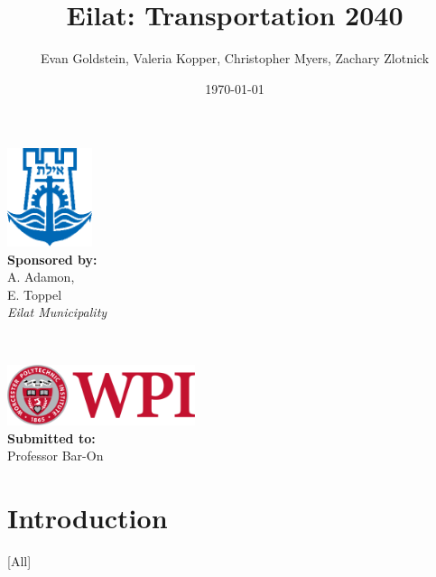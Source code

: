 \documentclass[12pt]{article}                         %
\title{Eilat: Transportation 2040}
\author{Evan Goldstein, Valeria Kopper, Christopher Myers, Zachary Zlotnick}
\date{\today}
\begin{document}
\maketitle

\vspace{12cm}
\begin{minipage}{0.5\textwidth}
    \begin{flushleft} \large
        \includegraphics[width=2.5cm]{eilat_logo.png} \\
        \textbf{Sponsored by:} \\
        A. Adamon, \\
        E. Toppel \\
        \textit{Eilat Municipality}
    \end{flushleft}
\end{minipage}
~
\begin{minipage}{0.4\textwidth}
    \begin{flushright} \large
        \includegraphics[width=5.5cm]{WPI_logo.png} \\
        \vspace{0.7cm}
        \textbf{Submitted to:}\\
        Professor Bar-On
        \vspace{1.5cm}
    \end{flushright}
\end{minipage}

\newpage

\renewcommand\abstractname{Summary} %

\tableofcontents
\newpage
\listofauthorships
\newpage
{}
\doublespacing

\section{Introduction}[All]
\end{document}
